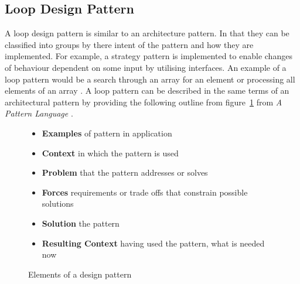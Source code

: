 \subsection{Loop Design Pattern}

A loop design pattern is similar to an architecture pattern.
In that they can be classified into groups by there intent of
the pattern and how they are implemented.
For example, a strategy pattern is implemented to enable changes of
behaviour dependent on some input by utilising interfaces.
An example of a loop pattern would be a search through
an array for an element or processing all elements of an array
\cite{loop-patterns}.
A loop pattern can be described in the same terms of an architectural pattern
by providing the following outline from figure~\ref{l:design-pattern}
from \textit{A Pattern Language} \cite{pattern-lang}.

\begin{figure}[ht]
\begin{itemize}
    \item{\textbf{Examples} of pattern in application}
    \item{\textbf{Context} in which the pattern is used}
    \item{\textbf{Problem} that the pattern addresses or solves}
    \item{\textbf{Forces} requirements or trade offs that constrain possible
        solutions}
    \item{\textbf{Solution} the pattern}
    \item{\textbf{Resulting Context} having used the pattern, what is needed
        now}
\end{itemize}
    \caption{Elements of a design pattern\cite{pattern-lang}}
    \label{l:design-pattern}
\end{figure}


